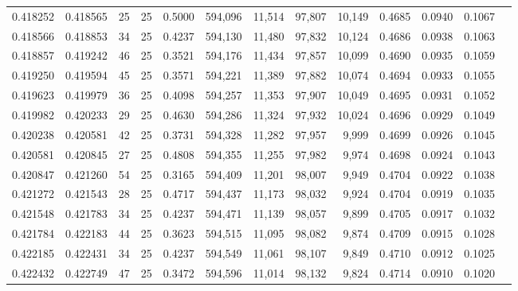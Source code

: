 \begin{tabular}{rrrrrrrrrrrrr}
0.418252 & 0.418565 &    25 &  25 &                                     0.5000 & 594,096 &  11,514 &  97,807 &  10,149 & 0.4685 & 0.0940 & 0.1067 \\
0.418566 & 0.418853 &    34 &  25 &                                     0.4237 & 594,130 &  11,480 &  97,832 &  10,124 & 0.4686 & 0.0938 & 0.1063 \\
0.418857 & 0.419242 &    46 &  25 &                                     0.3521 & 594,176 &  11,434 &  97,857 &  10,099 & 0.4690 & 0.0935 & 0.1059 \\
0.419250 & 0.419594 &    45 &  25 &                                     0.3571 & 594,221 &  11,389 &  97,882 &  10,074 & 0.4694 & 0.0933 & 0.1055 \\
0.419623 & 0.419979 &    36 &  25 &                                     0.4098 & 594,257 &  11,353 &  97,907 &  10,049 & 0.4695 & 0.0931 & 0.1052 \\
0.419982 & 0.420233 &    29 &  25 &                                     0.4630 & 594,286 &  11,324 &  97,932 &  10,024 & 0.4696 & 0.0929 & 0.1049 \\
0.420238 & 0.420581 &    42 &  25 &                                     0.3731 & 594,328 &  11,282 &  97,957 &   9,999 & 0.4699 & 0.0926 & 0.1045 \\
0.420581 & 0.420845 &    27 &  25 &                                     0.4808 & 594,355 &  11,255 &  97,982 &   9,974 & 0.4698 & 0.0924 & 0.1043 \\
0.420847 & 0.421260 &    54 &  25 &                                     0.3165 & 594,409 &  11,201 &  98,007 &   9,949 & 0.4704 & 0.0922 & 0.1038 \\
0.421272 & 0.421543 &    28 &  25 &                                     0.4717 & 594,437 &  11,173 &  98,032 &   9,924 & 0.4704 & 0.0919 & 0.1035 \\
0.421548 & 0.421783 &    34 &  25 &                                     0.4237 & 594,471 &  11,139 &  98,057 &   9,899 & 0.4705 & 0.0917 & 0.1032 \\
0.421784 & 0.422183 &    44 &  25 &                                     0.3623 & 594,515 &  11,095 &  98,082 &   9,874 & 0.4709 & 0.0915 & 0.1028 \\
0.422185 & 0.422431 &    34 &  25 &                                     0.4237 & 594,549 &  11,061 &  98,107 &   9,849 & 0.4710 & 0.0912 & 0.1025 \\
0.422432 & 0.422749 &    47 &  25 &                                     0.3472 & 594,596 &  11,014 &  98,132 &   9,824 & 0.4714 & 0.0910 & 0.1020 \\

\end{tabular}
